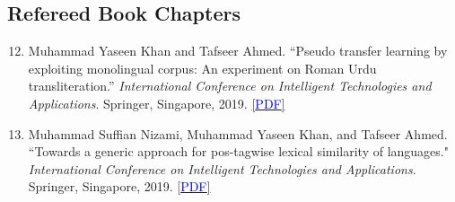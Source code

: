 \documentclass[10pt]{article}
\begin{document}
\subsection*{Refereed Book Chapters}
\begin{enumerate}
\setcounter{enumi}{11}
\itemsep=0em
\item Muhammad Yaseen Khan and Tafseer Ahmed. ``Pseudo transfer learning by exploiting monolingual corpus: An experiment on Roman Urdu transliteration.'' \emph{International Conference on Intelligent Technologies and Applications}. Springer, Singapore, 2019. \href{https://doi.org/10.1007/978-981-15-5232-8_36}{\scshape\small [\textcolor{blue}{PDF}]}

\item Muhammad Suffian Nizami, Muhammad Yaseen Khan, and Tafseer Ahmed. ``Towards a generic approach for pos-tagwise lexical similarity of languages." \emph{International Conference on Intelligent Technologies and Applications}. Springer, Singapore, 2019. \href{https://doi.org/10.1007/978-981-15-5232-8_42}{\scshape\small [\textcolor{blue}{PDF}]}

\end{enumerate}
\end{document}
